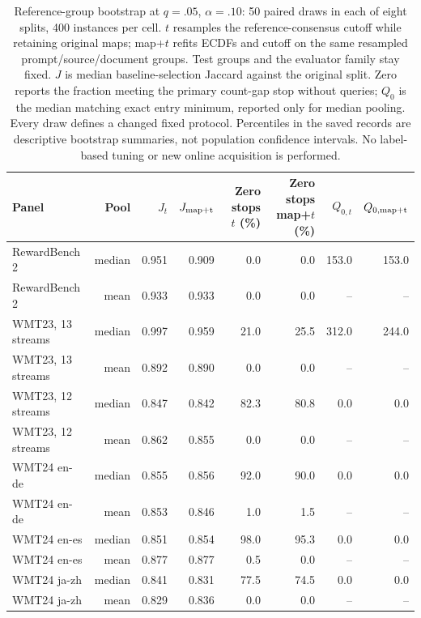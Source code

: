 \begin{table}[t]
\centering\small
\begin{tabular}{lrrrrrrr}
\toprule
Panel & Pool & $J_t$ & $J_{\rm map+t}$ & \shortstack{Zero stops\\$t$ (\%)} & \shortstack{Zero stops\\map+$t$ (\%)} & $Q_{0,t}$ & $Q_{0,\rm map+t}$ \\
\midrule
RewardBench 2 & median & 0.951 & 0.909 & 0.0 & 0.0 & 153.0 & 153.0 \\
RewardBench 2 & mean & 0.933 & 0.933 & 0.0 & 0.0 & -- & -- \\
WMT23, 13 streams & median & 0.997 & 0.959 & 21.0 & 25.5 & 312.0 & 244.0 \\
WMT23, 13 streams & mean & 0.892 & 0.890 & 0.0 & 0.0 & -- & -- \\
WMT23, 12 streams & median & 0.847 & 0.842 & 82.3 & 80.8 & 0.0 & 0.0 \\
WMT23, 12 streams & mean & 0.862 & 0.855 & 0.0 & 0.0 & -- & -- \\
WMT24 en-de & median & 0.855 & 0.856 & 92.0 & 90.0 & 0.0 & 0.0 \\
WMT24 en-de & mean & 0.853 & 0.846 & 1.0 & 1.5 & -- & -- \\
WMT24 en-es & median & 0.851 & 0.854 & 98.0 & 95.3 & 0.0 & 0.0 \\
WMT24 en-es & mean & 0.877 & 0.877 & 0.5 & 0.0 & -- & -- \\
WMT24 ja-zh & median & 0.841 & 0.831 & 77.5 & 74.5 & 0.0 & 0.0 \\
WMT24 ja-zh & mean & 0.829 & 0.836 & 0.0 & 0.0 & -- & -- \\
\bottomrule
\end{tabular}
\caption{Reference-group bootstrap at $q=.05$, $\alpha=.10$: 50 paired draws in each of eight splits, 400 instances per cell. $t$ resamples the reference-consensus cutoff while retaining original maps; map+$t$ refits ECDFs and cutoff on the same resampled prompt/source/document groups. Test groups and the evaluator family stay fixed. $J$ is median baseline-selection Jaccard against the original split. Zero reports the fraction meeting the primary count-gap stop without queries; $Q_0$ is the median matching exact entry minimum, reported only for median pooling. Every draw defines a changed fixed protocol. Percentiles in the saved records are descriptive bootstrap summaries, not population confidence intervals. No label-based tuning or new online acquisition is performed.}
\label{tab:cutoff-bootstrap}
\end{table}
